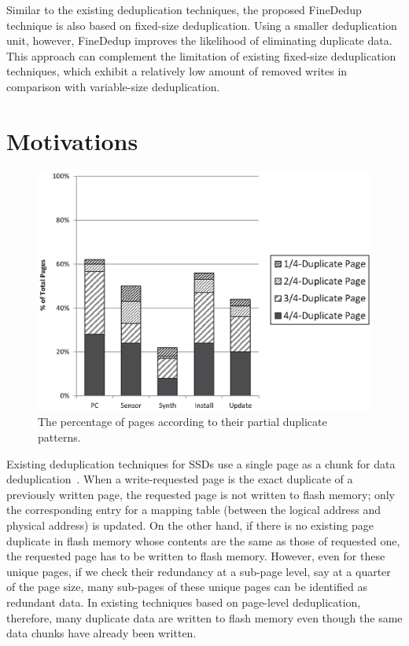 Similar to the existing deduplication techniques,
the proposed FineDedup technique is also based on fixed-size deduplication.
Using a smaller deduplication unit,
however, FineDedup improves the likelihood of eliminating duplicate data.
This approach can complement the limitation of existing fixed-size deduplication techniques,
which exhibit a relatively low amount of removed writes 
in comparison with variable-size deduplication.

\section{Motivations}

\begin{figure}[t]
	\center
	\includegraphics[scale=0.6]{figure/finededup/dupChunkperReq}
	\caption{The percentage of pages according to their partial duplicate patterns.} %
	\label{fig:percentage}
\end{figure}

Existing deduplication techniques for SSDs use a single page as a chunk for data deduplication~\cite{caftl,value-locality}.
When a write-requested page is the exact duplicate of a previously written page, 
the requested page is not written to flash memory; only the corresponding entry for a mapping table (between the
logical address and physical address) is updated.
On the other hand, if there is no existing page duplicate in flash memory whose contents are the same as those of requested one,
the requested page has to be written to flash memory.
However, even for these unique pages, if we check their redundancy at a sub-page level, say at a quarter of the page size,
many sub-pages of these unique pages can be identified as redundant data.
In existing techniques based on page-level deduplication, therefore, many duplicate data are written to flash memory even though 
the same data chunks have already been written.


